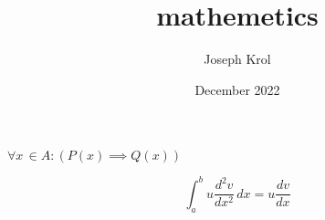 \documentclass{article}
\title{mathemetics}
\author{Joseph Krol}
\date{December 2022}
\begin{document}
\maketitle
\begin{center}
\huge $\forall x\, \in A:(P(x) \implies Q(x))$
\end{center}
\huge \[ \int_{a}^{b} u\dfrac{d^2v}{dx^2} \,dx = u\dfrac{dv}{dx}\]
\end{document}
